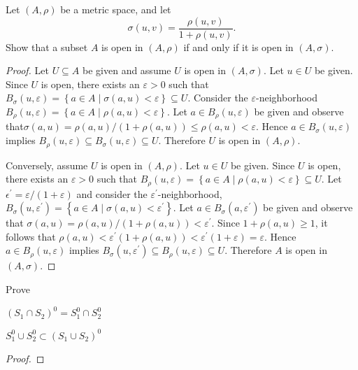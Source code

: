\documentclass[10pt]{amsart}
\begin{document}
\begin{ex4}{}
	Let $(A,\rho)$ be a metric space, and let 
		$$\sigma(u,v) = \frac{\rho(u,v)}{1 + \rho(u,v)}.$$
	Show that a subset $A$ is open in $(A,\rho)$ if and only if it is open in $(A,\sigma)$.
	
	\begin{proof}
		Let $U \subseteq A$ be given and assume $U$ is open in $(A,\sigma)$.
		Let $u \in U$ be given.
		Since $U$ is open, there exists an $\varepsilon > 0$ such that $B_\sigma(u,\varepsilon) = \left\{a \in A \mid \sigma(a,u) < \varepsilon\right\} \subseteq U$.
		Consider the $\varepsilon$-neighborhood $B_\rho(u,\varepsilon) = \left\{ a \in A \mid \rho(a,u) < \varepsilon\right\}$.
		Let $a \in B_\rho(u,\varepsilon)$ be given and observe that$\sigma(a,u) = \rho(a,u)/(1 + \rho(a,u)) \leq \rho(a,u) < \varepsilon$.
		Hence $a \in B_\sigma(u,\varepsilon)$ implies $B_\rho(u,\varepsilon) \subseteq B_\sigma(u,\varepsilon) \subseteq U$.
		Therefore $U$ is open in $(A,\rho)$.
		
		Conversely, assume $U$ is open in $(A,\rho)$.
		Let $u \in U$ be given.
		Since $U$ is open, there exists an $\varepsilon > 0$ such that $B_\rho(u,\varepsilon) = \left\{a \in A \mid \rho(a,u) < \varepsilon\right\} \subseteq U$.
		Let $\epsilon^{\prime} = \varepsilon/(1 + \varepsilon)$ and consider the $\varepsilon^{\prime}$-neighborhood, $B_\sigma(u, \varepsilon^{\prime}) = \left\{a \in A \mid \sigma(a,u) < \varepsilon^{\prime} \right\}$.
		Let $a \in B_\sigma(a,\varepsilon^{\prime})$ be given and observe that $\sigma(a,u) = \rho(a,u)/(1 + \rho(a,u)) < \varepsilon^{\prime}$.
		Since $1 + \rho(a,u) \geq 1$, it follows that $\rho(a,u) < \varepsilon^{\prime}(1 + \rho(a,u)) < \varepsilon^{\prime}(1 + \varepsilon) = \varepsilon$.
		Hence $a \in B_\rho(u,\varepsilon)$ implies $B_\sigma(u,\varepsilon^{\prime}) \subseteq B_\rho(u,\varepsilon) \subseteq U$.
		Therefore $A$ is open in $(A,\sigma)$.
	\end{proof}
\end{ex4}{}

\begin{ex13}{}
	Prove\\
	\begin{inparaenum}[(a)]
		\item\label{13a}
			$(S_1 \cap S_2)^0 = S_1^0 \cap S_2^0$\hspace{10mm}
		\item\label{13b}
			$S_1^0 \cup S_2^0 \subset (S_1 \cup S_2)^0$
	\end{inparaenum}
	
	\begin{proof}
	\end{proof}
\end{ex13}{}
\end{document}
